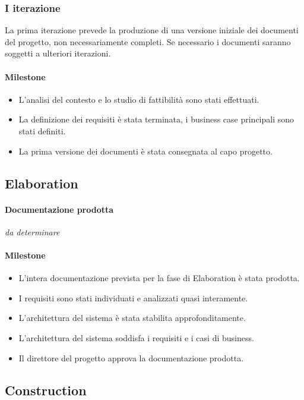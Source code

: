 \subsubsection{I iterazione}

La prima iterazione prevede la produzione di una versione iniziale dei documenti del progetto, non necessariamente completi.
Se necessario i documenti saranno soggetti a ulteriori iterazioni.

\paragraph{Milestone}
\begin{itemize}
	\item L'analisi del contesto e lo studio di fattibilit\`a sono stati effettuati.
	\item La definizione dei requisiti \`e stata terminata, i business case principali sono stati definiti.
	\item La prima versione dei documenti \`e stata consegnata al capo progetto.
\end{itemize}

\subsection{Elaboration}

\paragraph{Documentazione prodotta}
\emph{da determinare}

\paragraph{Milestone}
\begin{itemize}
	\item L'intera documentazione prevista per la fase di Elaboration \`e stata prodotta.
	\item I requisiti sono stati individuati e analizzati quasi interamente.
	\item L'architettura del sistema \`e stata stabilita approfonditamente.
	\item L'architettura del sistema soddisfa i requisiti e i casi di business.
	\item Il direttore del progetto approva la documentazione prodotta.
\end{itemize}

\subsection{Construction}

